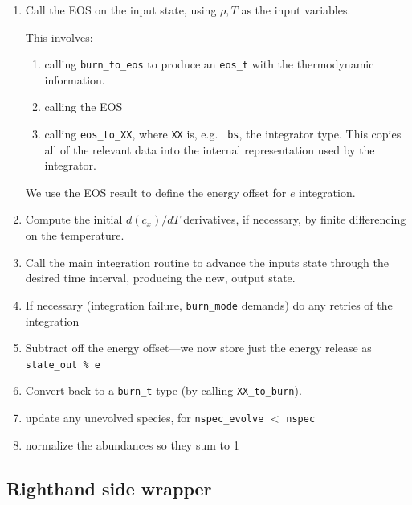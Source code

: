 \begin{enumerate}
  \item Call the EOS on the input state, using $\rho, T$ as the input
    variables.  

    This involves:
    \begin{enumerate}
      \item calling {\tt burn\_to\_eos} to produce an {\tt eos\_t}
        with the thermodynamic information.

      \item calling the EOS

      \item calling {\tt eos\_to\_XX}, where {\tt XX} is, e.g. {\tt
        bs}, the integrator type.  This copies all of the relevant 
        data into the internal representation used by the integrator.
    \end{enumerate}

    We use the EOS result to define the energy offset for $e$
    integration.

  \item Compute the initial $d(c_x)/dT$ derivatives, if necessary, by
    finite differencing on the temperature.

  \item Call the main integration routine to advance the inputs state
    through the desired time interval, producing the new, output
    state.

  \item If necessary (integration failure, {\tt burn\_mode} demands)
    do any retries of the integration

  \item Subtract off the energy offset---we now store just the
    energy release as {\tt state\_out \% e}

  \item Convert back to a {\tt burn\_t} type (by calling {\tt XX\_to\_burn}).

  \item update any unevolved species, for {\tt nspec\_evolve} $<$
    {\tt nspec}

  \item normalize the abundances so they sum to 1
\end{enumerate}

    
\subsection{Righthand side wrapper}

